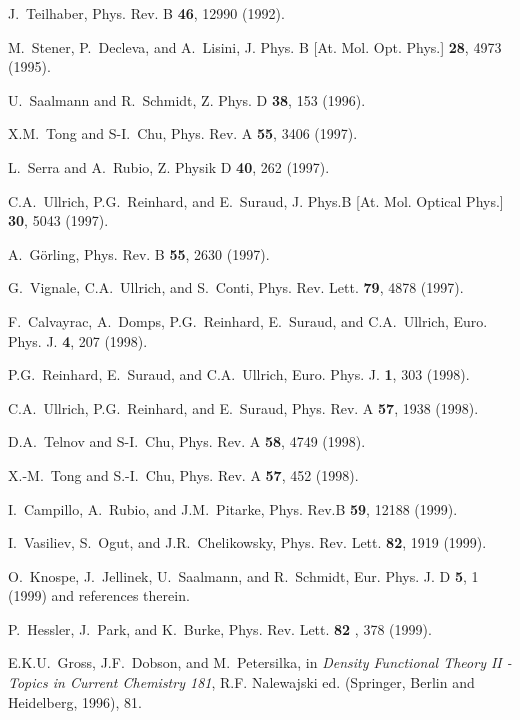 \begin{references}
 J.~Teilhaber, Phys. Rev. B {\bf 46}, 12990 (1992).

 M.~Stener, P.~Decleva, and A.~Lisini, J. Phys. B [At.
Mol. Opt. Phys.] {\bf 28}, 4973 (1995).

 U.~Saalmann and R.~Schmidt, Z. Phys. D {\bf 38}, 153
(1996).

 X.M.~Tong and S-I.~Chu, Phys. Rev. A {\bf 55}, 3406 (1997).

 L.~Serra and A.~Rubio, Z. Physik D {\bf 40}, 262 (1997).

 C.A.~Ullrich, P.G.~Reinhard, and E.~Suraud, J. Phys.B
[At. Mol. Optical Phys.] {\bf 30}, 5043 (1997).

 A.~G\"orling, Phys. Rev. B {\bf 55}, 2630 (1997).

 G.~Vignale, C.A.~Ullrich, and S.~Conti, Phys. Rev. Lett. 
{\bf 79}, 4878 (1997).

 F.~Calvayrac, A.~Domps, P.G.~Reinhard, E.~Suraud, and
C.A.~Ullrich, Euro. Phys. J. {\bf 4}, 207 (1998).

 P.G.~Reinhard, E.~Suraud, and C.A.~Ullrich, Euro. Phys.
J. {\bf 1}, 303 (1998).

 C.A.~Ullrich, P.G.~Reinhard, and E.~Suraud, Phys. Rev. A 
{\bf 57}, 1938 (1998).

 D.A.~Telnov and S-I.~Chu, Phys. Rev. A {\bf 58}, 4749
(1998).

 X.-M.~Tong and S.-I.~Chu, Phys. Rev. A {\bf 57}, 452 (1998).

 I.~Campillo, A.~Rubio, and J.M.~Pitarke, Phys. Rev.B 
{\bf 59}, 12188 (1999).

 I.~Vasiliev, S.~Ogut, and J.R.~Chelikowsky, Phys. Rev.
Lett. {\bf 82}, 1919 (1999).

 O.~Knospe, J.~Jellinek, U.~Saalmann, and R.~Schmidt, Eur.
Phys. J. D {\bf 5}, 1 (1999) and references therein.

 P.~Hessler, J.~Park, and K.~Burke, Phys. Rev. Lett. {\bf 82%
}, 378 (1999).

 E.K.U.~Gross, J.F.~Dobson, and M.~Petersilka, in {\it %
Density Functional Theory II - Topics in Current Chemistry 181}, R.F.
Nalewajski ed. (Springer, Berlin and Heidelberg, 1996), 81.


\end{references}
